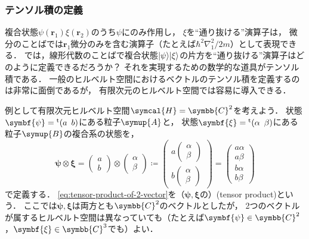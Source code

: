 \documentclass[
]{sotsu}
\newcommand{\bpsi}{\symbf{\psi}}
\newcommand{\bxi}{\symbf{\xi}}
\begin{document}
\subsubsection{テンソル積の定義}

複合状態$\psi(\symbf{r}_1) \xi(\symbf{r}_2)$のうち$\psi$にのみ作用し，
$\xi$を``通り抜ける''演算子は，
微分のことばでは$\symbf{r}_1$微分のみを含む演算子（たとえば$\hbar^2 \nabla_1^2 / 2 m$）として表現できる．
では，線形代数のことばで複合状態$\ket{\psi} \ket{\xi}$の片方を``通り抜ける''演算子はどのように定義できるだろうか？\quad 
それを実現するための数学的な道具がテンソル積である．
一般のヒルベルト空間におけるベクトルのテンソル積を定義するのは非常に面倒であるが，
有限次元のヒルベルト空間では容易に導入できる．

例として有限次元ヒルベルト空間$\symcal{H} = \symbb{C}^2$を考えよう．
状態$\bpsi = \cvector{a ; b}$にある粒子$\symup{A}$と，
状態$\bxi = \cvector{\alpha ; \beta}$にある粒子$\symup{B}$の複合系の状態を，
\begin{equation}
    \label{eq:tensor-product-of-2-vector}
    \bpsi \otimes \bxi
        = 
        \begin{pmatrix}
            a  \\  b
        \end{pmatrix}
        \otimes 
        \begin{pmatrix}
            \alpha  \\  \beta
        \end{pmatrix}
        \coloneq
        \begin{pmatrix}
            a
            \begin{pmatrix}
                \alpha  \\  \beta
            \end{pmatrix}
            \\
            b
            \begin{pmatrix}
                \alpha  \\  \beta
            \end{pmatrix}
        \end{pmatrix}
        = 
        \begin{pmatrix}
            a \alpha  \\  a \beta  \\  b \alpha  \\  b \beta
        \end{pmatrix}
\end{equation}
で定義する．
\cref{eq:tensor-product-of-2-vector}を（$\bpsi, \bxi$の）(tensor product)という．
ここでは$\bpsi, \bxi$は両方とも$\symbb{C}^2$のベクトルとしたが，
2つのベクトルが属するヒルベルト空間は異なっていても（たとえば$\bpsi \in \symbb{C}^2$，$\bxi \in \symbb{C}^3$でも）よい．
\end{document}
